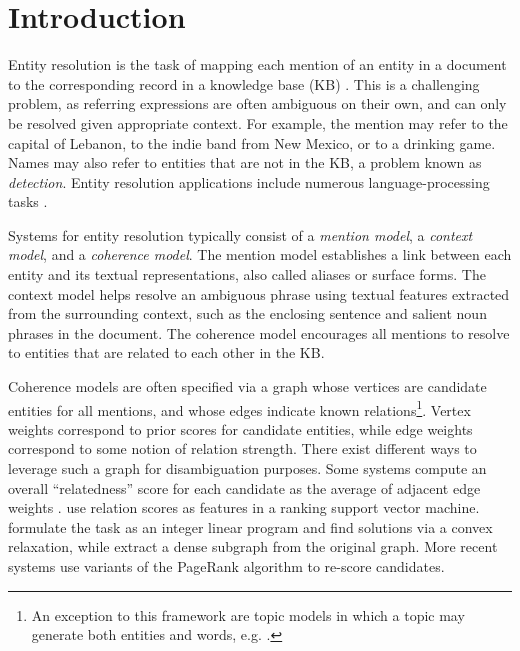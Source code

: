 \section{Introduction}
\label{sec:intro}

Entity resolution is the task of mapping each mention of an entity in a document to the corresponding record in a knowledge base (KB) \cite{BunescuP06,Cucerzan07,Dredze2010,Hachey2013130}.  
This is a challenging problem, as referring expressions are often ambiguous on their own, and can only be resolved given appropriate context. For example, the mention  may refer to the capital of Lebanon, to the indie band from New Mexico, or to a drinking game. Names may also refer to entities that are not in the KB, a problem known as \emph{{\NIL} detection}. 
Entity resolution applications include numerous language-processing tasks  \cite{Gabrilovich2007,Lin2012,finin2009Coreference,mayfield2009cross}. %

Systems for entity resolution typically consist of a \emph{mention model}, a \emph{context model}, and a \emph{coherence model}. The mention model establishes a link between each entity and its textual representations, also called aliases or surface forms. The context model helps resolve an ambiguous phrase using textual features extracted from the surrounding context, such as the enclosing sentence and salient noun phrases in the document. The coherence model encourages all mentions to resolve to entities that are related to each other in the KB. 

Coherence models are often specified via a graph whose vertices are candidate entities for all mentions, and whose edges indicate known relations\footnote{An exception to this framework are topic models in which a topic may generate both entities and words, e.g. \cite{HanS12,houlsby2014scalable}.}. Vertex weights correspond to prior scores for candidate entities, while edge weights correspond to some notion of relation strength. There exist different ways to leverage such a graph for disambiguation purposes. Some systems compute an overall ``relatedness'' score for each candidate as the average of adjacent edge weights \cite{Milne2008,Ferragina10}.  use relation scores as features in a ranking support vector machine.  formulate the task as an integer linear program and find solutions via a convex relaxation, while  extract a dense subgraph from the original graph. More recent systems \cite{Han2011,He13,Alhelbawy14,Pershina2015} use variants of the PageRank algorithm \cite{PageRank} to re-score candidates.  

